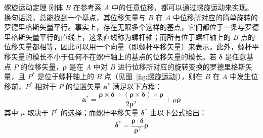 \begin{myTheorem}{螺旋运动定理}
刚体 $B$ 在参考系 $A$ 中的任意位移，都可以通过螺旋运动来实现。换句话说，总能找到一个基点，其位移矢量与 $B$ 在 $A$ 中位移所对应的简单旋转的罗德里格斯矢量平行。事实上，存在无限多个这样的基点，它们都位于一条与罗德里格斯矢量平行的直线上，这条直线称为螺杆轴；而所有位于螺杆轴上的 $B$ 点的位移矢量都相等，因此可以用一个向量（即螺杆平移矢量）来表示。此外，螺杆平移矢量的模长不小于任何不在螺杆轴上的基点的位移矢量的模长。若 $\bm{\delta}$ 是任意基点 $P$ 的位移矢量，$\bm{\rho}$ 是在 $A$ 中对 $B$ 进行位移所对应的旋转变换的罗德里格斯矢量，且 $P^*$ 是位于螺杆轴上的 $B$ 点（见图~\ref{fig:螺旋运动}），则在 $B$ 在 $A$ 中发生位移前，$P^*$ 相对于 $P$ 的位置矢量 $\bm{a}^*$ 满足以下方程：
\begin{equation}
    \label{eq:螺旋运动:a_star公式}
    \bm{a}^* = \frac{\bm{\rho} \times \bm{\delta} + (\bm{\rho} \times \bm{\delta}) \times \bm{\rho}}{2\bm{\rho}^2} + \mu \bm{\rho}
\end{equation}
其中 $\mu$ 取决于 $P^*$ 的选择；而螺杆平移矢量 $\bm{\delta}^*$ 由以下公式给出：
$$
\bm{\delta}^* = \frac{\bm{\rho} \cdot \bm{\delta}}{\bm{\rho}^2} \bm{\rho}
$$
\end{myTheorem}
